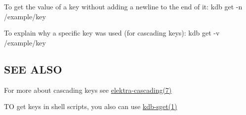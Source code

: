 To get the value of a key without adding a newline to the end of it\+: {\ttfamily kdb get -\/n /example/key}

To explain why a specific key was used (for cascading keys)\+: {\ttfamily kdb get -\/v /example/key}

\subsection*{S\+E\+E A\+L\+S\+O}


\begin{DoxyItemize}
\item For more about cascading keys see \hyperlink{md_doc_help_elektra-cascading_doc_help_elektra-cascading_md}{elektra-\/cascading(7)}
\item T\+O get keys in shell scripts, you also can use \hyperlink{md_doc_help_kdb-sget_doc_help_kdb-sget_md}{kdb-\/sget(1)} 
\end{DoxyItemize}
